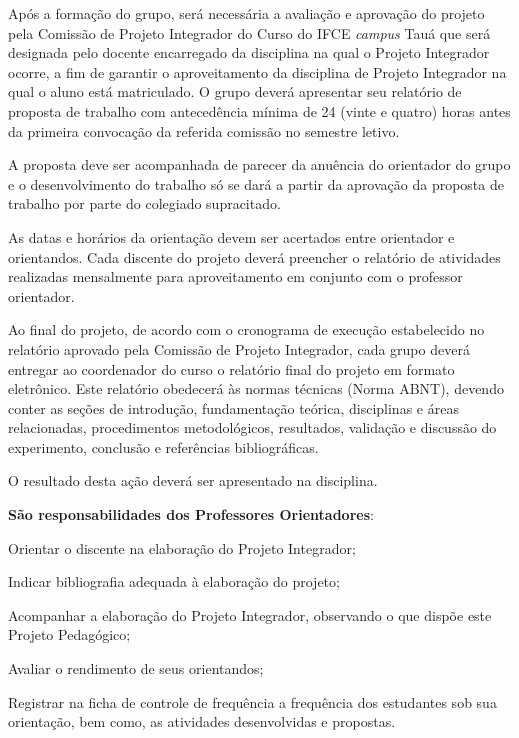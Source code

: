 \documentclass[
	12pt,				%
	openright,			%
	twoside,			%
	a4paper,			%
	chapter=TITLE,		%
	english,			%
	french,				%
	spanish,			%
	brazil,				%
	]{abntex2}
\begin{document}
Após a formação do grupo, será necessária a avaliação e aprovação do projeto pela Comissão de Projeto Integrador do Curso do IFCE \textit{campus} Tauá que será designada pelo docente encarregado da disciplina na qual o Projeto Integrador ocorre, a fim de garantir o aproveitamento da disciplina de Projeto Integrador na qual o aluno está matriculado. O grupo deverá apresentar seu relatório de proposta de trabalho com antecedência mínima de 24 (vinte e quatro) horas antes da primeira convocação da referida comissão no semestre letivo. 

A proposta deve ser acompanhada de parecer da anuência do orientador do grupo e o desenvolvimento do trabalho só se dará a partir da aprovação da proposta de trabalho por parte do colegiado supracitado.

As datas e horários da orientação devem ser acertados entre orientador e orientandos. Cada discente do projeto deverá preencher o relatório de atividades realizadas mensalmente para aproveitamento  em conjunto com o professor orientador. 

Ao final do projeto, de acordo com o cronograma de execução estabelecido no relatório aprovado pela  Comissão de Projeto Integrador, cada grupo deverá entregar ao coordenador do curso o relatório final do projeto em formato eletrônico. Este relatório  obedecerá às normas técnicas (Norma ABNT), devendo  conter as seções de introdução, fundamentação teórica, disciplinas e áreas relacionadas, procedimentos metodológicos, resultados, validação e discussão do experimento, conclusão e referências bibliográficas. 

O resultado desta ação deverá ser apresentado na disciplina.



\textbf{São responsabilidades dos Professores Orientadores}:
\begin{alineas}
    \item Orientar o discente na elaboração do Projeto Integrador;
    \item Indicar bibliografia adequada à elaboração do projeto;
    \item Acompanhar a elaboração do Projeto Integrador, observando o que dispõe este Projeto Pedagógico;
    \item Avaliar o rendimento de seus orientandos;
    \item Registrar na ficha de controle de frequência a frequência dos estudantes sob sua orientação, bem como, as atividades desenvolvidas e propostas.
\end{alineas}   
\end{document}
